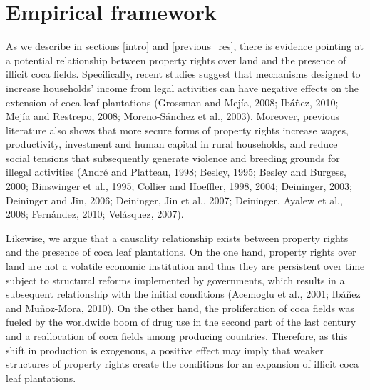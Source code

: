 \section{Empirical framework}
\label{identification}

As we describe in sections \ref{intro} and \ref{previous_res}, there is  evidence pointing at a potential relationship between property rights over land and the presence of illicit coca fields. Specifically, recent studies suggest that mechanisms designed to increase households' income from legal activities can have negative effects on the extension of coca leaf plantations (Grossman and Mej\'{i}a, 2008; Ib\'{a}\~{n}ez, 2010; Mej\'{i}a and Restrepo, 2008; Moreno-S\'{a}nchez et al., 2003). Moreover, previous literature also shows that more secure forms of property rights increase wages, productivity, investment and human capital in rural households, and reduce social tensions that subsequently generate violence and breeding grounds for illegal activities (Andr\'{e} and Platteau, 1998; Besley, 1995; Besley and Burgess, 2000; Binswinger et al., 1995; Collier and Hoeffler, 1998, 2004; Deininger, 2003; Deininger and Jin, 2006; Deininger, Jin et al., 2007; Deininger, Ayalew et al., 2008; Fern\'{a}ndez, 2010; Vel\'{a}squez, 2007). 

Likewise, we argue that a causality relationship exists between property rights and the presence of coca leaf plantations. On the one hand, property rights over land are not a volatile economic institution and thus they are persistent over time subject to structural reforms implemented by governments, which results in a subsequent relationship with the initial conditions (Acemoglu et al., 2001; Ib\'{a}\~{n}ez and Mu\~{n}oz-Mora, 2010). On the other hand, the proliferation of coca fields was fueled by the worldwide boom of drug use in the second part of the last century and a reallocation of coca fields among producing countries. Therefore, as this shift in production is exogenous, a positive effect may imply that weaker structures of property rights create the conditions for an expansion of illicit coca leaf plantations.

